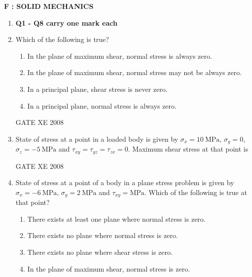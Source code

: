 \documentclass[12pt]{article}
\begin{document}
\newpage

\begin{center}
    \textbf{\Large F : SOLID MECHANICS}
\end{center}

\begin{enumerate}
\item[] \textbf{Q1 - Q8 carry one mark each}

\item Which of the following is true?  

\begin{enumerate}

\item  In the plane of maximum shear, normal stress is always zero.
\item  In the plane of maximum shear, normal stress may not be always zero.
\item  In a principal plane, shear stress is never zero.
\item  In a principal plane, normal stress is always zero. 
\end{enumerate}

GATE XE 2008

\item State of stress at a point in a loaded body is given by $\sigma_x = 10 \ \text{MPa}$, $\sigma_y = 0$, $\sigma_z = -5 \ \text{MPa}$ and $\tau_{xy} = \tau_{yz} = \tau_{zx} = 0$. Maximum shear stress at that point is  

\begin{enumerate}
\end{enumerate}

GATE XE 2008

\item State of stress at a point of a body in a plane stress problem is given by $\sigma_x = -6 \ \text{MPa}$, $\sigma_y = 2 \ \text{MPa}$ and $\tau_{xy} = \text{MPa}$. Which of the following is true at that point?  

\begin{enumerate}
\item  There exists at least one plane where normal stress is zero. 
\item  There exists no plane where normal stress is zero.  
\item  There exists no plane where shear stress is zero.  
\item  In the plane of maximum shear, normal stress is zero. 
\end{enumerate}


\end{enumerate}
\end{document}
